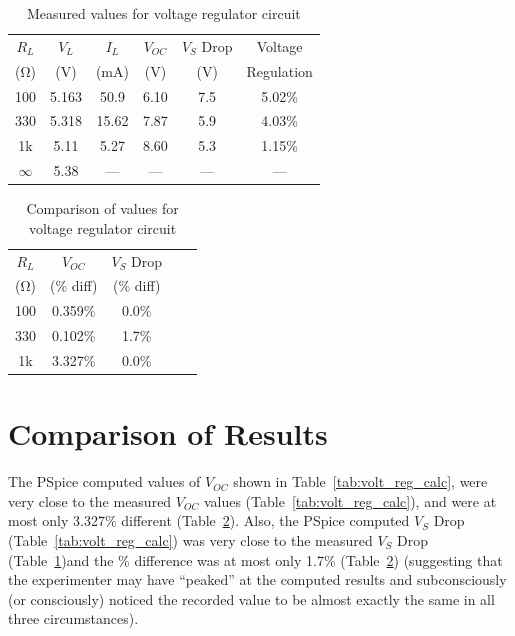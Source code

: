 \documentclass{article}
\begin{document}
\begin{table}
  \centering
  \begin{tabular}{cccccc}
    $R_L$ & $V_L$ & $I_L$ & $V_{OC}$ & $V_S$ Drop & Voltage \\
    (\si{\ohm}) & (\si{V}) & (\si{mA}) & (\si{V}) & (\si{V}) & Regulation \\
    \hline
    100 & 5.163 & 50.9 & 6.10 & 7.5 & 5.02\%  \\
    330 & 5.318 & 15.62 & 7.87 & 5.9 & 4.03\% \\
    1k & 5.11 & 5.27 & 8.60 & 5.3 & 1.15\% \\
    $\infty$ & 5.38 & --- & --- & --- & ---\\
  \end{tabular}
  \caption{\label{tab:volt_reg_meas} Measured values for voltage regulator circuit}
\end{table}

\begin{table}
  \centering
  \begin{tabular}{ccccc}
    $R_L$ & $V_{OC}$ & $V_S$ Drop \\
    (\si{\ohm}) & (\% diff) & (\% diff) \\
    \hline
    100 & 0.359\% & 0.0\% \\
    330 & 0.102\% & 1.7\% \\
    1k & 3.327\% & 0.0\% \\
  \end{tabular}
  \caption{\label{tab:volt_reg_diff} Comparison of values for voltage regulator circuit}
\end{table}

\section{Comparison of Results}
\label{sec:comp_of_res}

The PSpice computed values of $V_{OC}$ shown in Table~\ref{tab:volt_reg_calc}, were very close to the measured $V_{OC}$ values (Table~\ref{tab:volt_reg_calc}), and were at most only 3.327\% different (Table~\ref{tab:volt_reg_diff}). Also, the PSpice computed $V_S$ Drop (Table~\ref{tab:volt_reg_calc}) was very close to the measured $V_S$ Drop (Table~\ref{tab:volt_reg_meas})and the \% difference was at most only 1.7\% (Table~\ref{tab:volt_reg_diff}) (suggesting that the experimenter may have “peaked” at the computed results and subconsciously (or consciously) noticed the recorded value to be almost exactly the same in all three circumstances).
\end{document}
